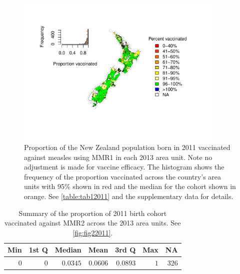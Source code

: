 \documentclass{article}
\begin{document}
\begin{figure}
\begin{center}
    \includegraphics[width=0.9\textwidth]{nir_census_MMR1_NIR_2011.pdf}
 \end{center}
    \caption{Proportion of the New Zealand population born in 2011 vaccinated against measles using MMR1 in each 2013 area unit. Note no adjustment is made for vaccine efficacy. The histogram shows the frequency of the proportion vaccinated across the country's area units with 95\% shown in red and the median for the cohort shown in orange. See \autoref{table:tab12011} and the supplementary data for details.}
\label{fig:fig12011}
\end{figure}

 \vspace{5mm} %
\begin{table}
\begin{center}
\begin{tabular}{rrrrrrr}
\hline\hline
\multicolumn{1}{c}{Min}&\multicolumn{1}{c}{1st Q}&\multicolumn{1}{c}{Median}&\multicolumn{1}{c}{Mean}&\multicolumn{1}{c}{3rd Q}&\multicolumn{1}{c}{Max}&\multicolumn{1}{c}{NA}\tabularnewline
\hline
$0$&$0$&$0.0345$&$0.0606$&$0.0893$&$1$&$326$\tabularnewline
\hline
\end{tabular}\end{center}\caption{Summary of the proportion of 2011 birth cohort vaccinated against MMR2 across the 2013 area units. See \autoref{fig:fig22011}.}
\label{table:tab22011}
\end{table}
\end{document}
